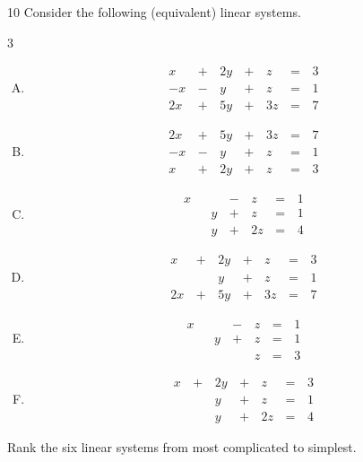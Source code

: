 \begin{activity}{10}
  Consider the following (equivalent) linear systems.
  \begin{multicols}{3}%
  \begin{enumerate}[(A)]
    \item 
	\[
		\begin{alignedat}{4}
   		  x &\,+\,& 2y  &\,+\,& z &\,=\,& 3 \\  
   		  -x &\,-\,& y  &\,+\,& z &\,=\,& 1 \\  
   		  2x &\,+\,& 5y  &\,+\,& 3z &\,=\,& 7   
   		\end{alignedat}
	\]

    \item 
	\[
		\begin{alignedat}{4}
   		  2x &\,+\,& 5y  &\,+\,& 3z &\,=\,& 7 \\  
   		  -x &\,-\,& y  &\,+\,& z &\,=\,& 1 \\  
   		  x &\,+\,& 2y  &\,+\,& z &\,=\,& 3  
   		\end{alignedat}
	\]

    \item \[
		\begin{alignedat}{4}
   		  x & &   &\,-\,& z &\,=\,& 1 \\  
   		   & & y  &\,+\,& z &\,=\,& 1 \\  
   		   & & y  &\,+\,& 2z &\,=\,& 4   
   		\end{alignedat}
	\]

    \item \[
		\begin{alignedat}{4}
   		  x &\,+\,& 2y  &\,+\,& z &\,=\,& 3 \\  
   		   & & y  &\,+\,& z &\,=\,& 1 \\  
   		  2x &\,+\,& 5y  &\,+\,& 3z &\,=\,& 7   
   		\end{alignedat}
	\]

    \item \[
		\begin{alignedat}{4}
   		  x & &   &\,-\,& z &\,=\,& 1 \\  
   		   & & y  &\,+\,& z &\,=\,& 1 \\  
   		   & &   & & z &\,=\,& 3   
   		\end{alignedat}
	\]

    \item \[
		\begin{alignedat}{4}
   		  x &\,+\,& 2y  &\,+\,& z &\,=\,& 3 \\  
   		   & & y  &\,+\,& z &\,=\,& 1 \\  
   		   & & y  &\,+\,& 2z &\,=\,& 4   
   		\end{alignedat}
	\]
	\end{enumerate}
    \end{multicols}
   Rank the six linear systems from most complicated to simplest.
\end{activity}


